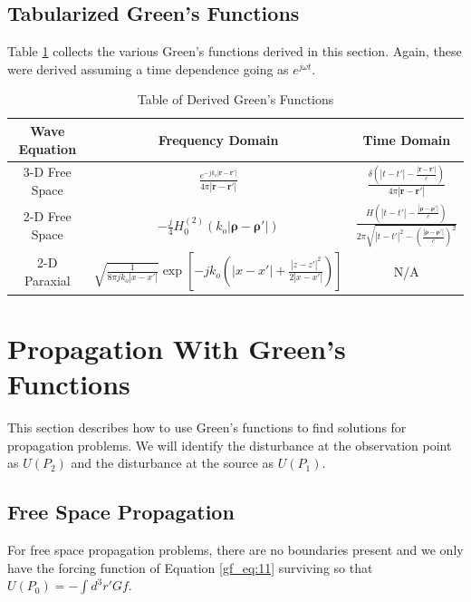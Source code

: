\subsection {Tabularized Green's Functions}
Table \ref{gf_tab:0} collects the various Green's functions derived in this section. Again, these were derived assuming a time dependence going as $e^{j\omega t}$.
\begin{table}[ht]
  \begin{center}
      \renewcommand{\baselinestretch}{1} \small\normalsize
  \begin{quote}
    \caption[Table of Derived Green's Functions]{Table of Derived Green's Functions\label{gf_tab:0}}
  \end{quote}
  \begin{tabular} {|c | c | c|}
    \hline
  \bf{Wave Equation} & \bf{Frequency Domain} & \bf{Time Domain}\\ \hline
  3-D Free Space & $\displaystyle\frac{e^{-jk_o|\mathbf{r} - \mathbf{r}'|}}{4\pi |\mathbf{r} - \mathbf{r}'|}$ &  $\displaystyle\frac{\delta\left(|t-t'|-\frac{|\mathbf{r}-\mathbf{r}'|}{c} \right)}{4\pi |\mathbf{r}-\mathbf{r}'|}$ \\ \hline
  2-D Free Space & $\displaystyle -\frac{j}{4}H_0^{(2)}\left(k_o|\boldsymbol{\rho} - \boldsymbol{\rho}' | \right)$ & $\displaystyle\frac{H\left(|t-t'| -\frac{|\boldsymbol{\rho} - \boldsymbol{\rho}'|}{c}\right)}{2\pi \sqrt{|t-t'|^2 -\left(\frac{|\boldsymbol{\rho} - \boldsymbol{\rho}'|}{c}\right)^2 }     }$  \\ \hline
  2-D Paraxial & $\displaystyle\sqrt{\frac{1}{8\pi jk_o|x-x'|}}\exp\left[-jk_o\left(|x-x'| + \frac{|z-z'|^2}{2|x-x'|}\right) \right]$ & N/A \\ \hline
\end{tabular}
\end{center}
\end{table}
\renewcommand{\baselinestretch}{2} \small\normalsize

\section {Propagation With Green's Functions}
This section describes how to use Green's functions to find solutions for propagation problems. We will identify the disturbance at the observation point as $U(P_2)$ and the disturbance at the source as $U(P_1)$.

\subsection {Free Space Propagation}
For free space propagation problems, there are no boundaries present and we only have the forcing function of Equation \ref{gf_eq:11} surviving so that $U(P_0) = -\int d^3r' Gf$. 

